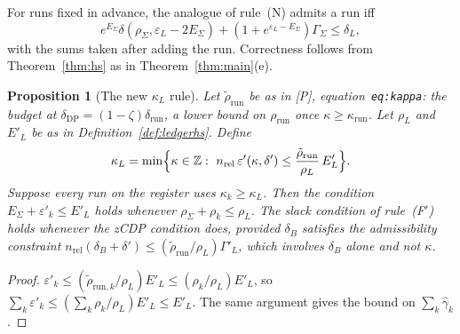\documentclass[11pt]{article}
\theoremstyle{definition}
\theoremstyle{plain}
\newtheorem{proposition}[definition]{Proposition}
\newcommand{\Z}{\mathbb{Z}}
\newcommand{\nrel}{n_{\mathrm{rel}}}
\newcommand{\Pp}{\textup{[P]}}
\begin{document}
For runs fixed in advance, the analogue of rule~(N) admits a run iff
\[
  e^{E_\Sigma}\delta(\rho_\Sigma,\varepsilon_L-2E_\Sigma)+(1+e^{\varepsilon_L-E_\Sigma})\Gamma_\Sigma\le\delta_L ,
\]
with the sums taken after adding the run. Correctness follows from Theorem~\ref{thm:hs} as in Theorem~\ref{thm:main}(e).

\begin{proposition}[The new $\kappa_L$ rule]\label{prop:kappaL}
Let $\tilde\rho_{\mathrm{run}}$ be as in \Pp, equation~\texttt{eq:kappa}: the budget at $\delta_{\mathrm{DP}}=(1-\zeta)\delta_{\mathrm{run}}$, a lower bound on $\rho_{\mathrm{run}}$ once $\kappa\ge\kappa_{\mathrm{run}}$. Let $\rho_L$ and $E'_L$ be as in Definition~\ref{def:ledgerhs}. Define
\[
  \kappa_L=\min\Bigl\{\kappa\in\Z:\ \nrel\,\varepsilon'(\kappa,\delta')\le\frac{\tilde\rho_{\mathrm{run}}}{\rho_L}\,E'_L\Bigr\}.
\]
Suppose every run on the register uses $\kappa_k\ge\kappa_L$. Then the condition $E_\Sigma+\varepsilon'_k\le E'_L$ holds whenever $\rho_\Sigma+\rho_k\le\rho_L$. The slack condition of rule~(F$'$) holds whenever the zCDP condition does, provided $\delta_B$ satisfies the admissibility constraint $\nrel(\delta_B+\delta')\le(\tilde\rho_{\mathrm{run}}/\rho_L)\Gamma'_L$, which involves $\delta_B$ alone and not $\kappa$.
\end{proposition}
\begin{proof}
$\varepsilon'_k\le(\tilde\rho_{\mathrm{run},k}/\rho_L)E'_L\le(\rho_k/\rho_L)E'_L$, so $\sum_k\varepsilon'_k\le(\sum_k\rho_k/\rho_L)E'_L\le E'_L$. The same argument gives the bound on $\sum_k\hat\gamma_k$.
\end{proof}
\end{document}
